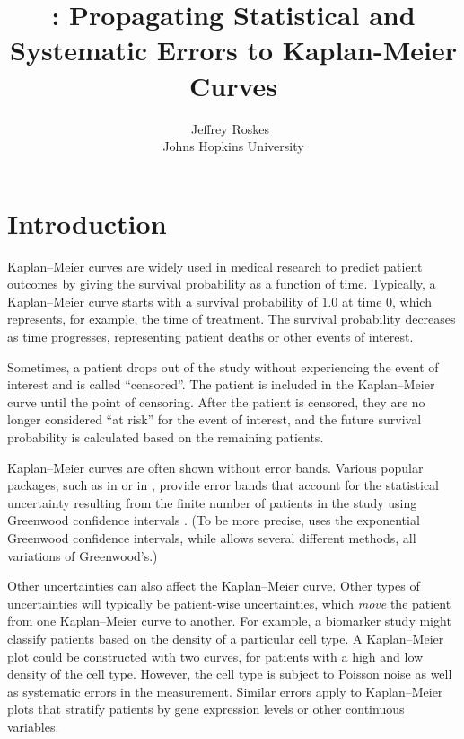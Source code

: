 \documentclass[article]{jss}
\author{Jeffrey Roskes~\orcidlink{0000-0001-8761-0490}\\Johns Hopkins University}
\title{\pkg{KoMbine}: Propagating Statistical and Systematic Errors to Kaplan-Meier Curves}
\begin{document}


\section{Introduction} \label{sec:intro}

Kaplan--Meier curves are widely used in medical research to predict patient outcomes by giving the survival probability as a function of time.  Typically, a Kaplan--Meier curve starts with a survival probability of \(1.0\) at time \(0\), which represents, for example, the time of treatment.  The survival probability decreases as time progresses, representing patient deaths or other events of interest.

Sometimes, a patient drops out of the study without experiencing the event of interest and is called ``censored''.  The patient is included in the Kaplan--Meier curve until the point of censoring.  After the patient is censored, they are no longer considered ``at risk'' for the event of interest, and the future survival probability is calculated based on the remaining patients.

Kaplan--Meier curves are often shown without error bands.  Various popular packages, such as  \citep{survival} in  \citep{R} or  \citep{lifelines} in , provide error bands that account for the statistical uncertainty resulting from the finite number of patients in the study using Greenwood confidence intervals \citep{Greenwood}.  (To be more precise,  uses the exponential Greenwood confidence intervals, while \citep{survival} allows several different methods, all variations of Greenwood's.)

Other uncertainties can also affect the Kaplan--Meier curve.  Other types of uncertainties will typically be patient-wise uncertainties, which \emph{move} the patient from one Kaplan--Meier curve to another.  For example, a biomarker study might classify patients based on the density of a particular cell type.  A Kaplan--Meier plot could be constructed with two curves, for patients with a high and low density of the cell type.  However, the cell type is subject to Poisson noise as well as systematic errors in the measurement.  Similar errors apply to Kaplan--Meier plots that stratify patients by gene expression levels or other continuous variables.
\end{document}
